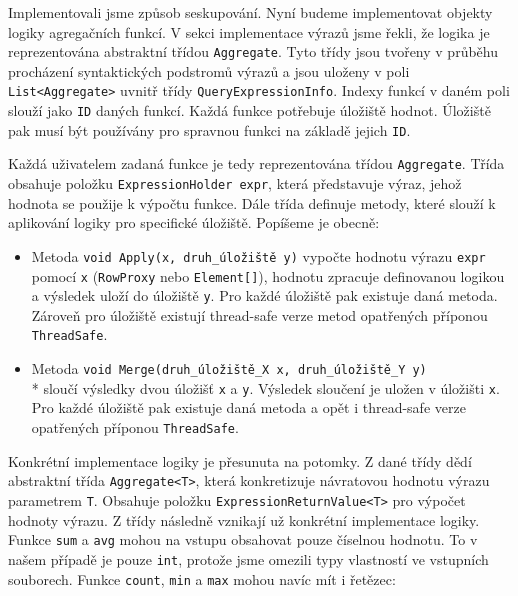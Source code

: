 Implementovali jsme způsob seskupování.
Nyní budeme implementovat objekty logiky agregačních funkcí.
V sekci implementace výrazů jsme řekli, že logika je reprezentována abstraktní třídou \texttt{Aggregate}.
Tyto třídy jsou tvořeny v průběhu procházení syntaktických podstromů výrazů a jsou uloženy v poli \texttt{List<Aggregate>} uvnitř třídy \texttt{QueryExpressionInfo}.
Indexy funkcí v daném poli slouží jako \texttt{ID} daných funkcí.
Každá funkce potřebuje úložiště hodnot.
Úložiště pak musí být používány pro spravnou funkci na základě jejich \texttt{ID}.

Každá uživatelem zadaná funkce je tedy reprezentována třídou \texttt{Aggregate}.
Třída obsahuje položku \texttt{ExpressionHolder expr}, která představuje výraz, jehož hodnota se použije k výpočtu funkce.
Dále třída definuje metody, které slouží k aplikování logiky pro specifické úložiště.
Popíšeme je obecně:
\begin{itemize}
\item Metoda \texttt{void Apply(x, druh\_úložiště y)} vypočte hodnotu výrazu \texttt{expr} pomocí \texttt{x} (\texttt{RowProxy} nebo \texttt{Element[]}), hodnotu zpracuje definovanou logikou a výsledek uloží do úložiště \texttt{y}.
Pro každé úložiště pak existuje daná metoda.
Zároveň pro úložiště existují thread-safe verze metod opatřených příponou \texttt{ThreadSafe}.

\item Metoda \texttt{void Merge(druh\_úložiště\_X x, druh\_úložiště\_Y y)}\\* sloučí výsledky dvou úložišť \texttt{x} a \texttt{y}. 
Výsledek sloučení je uložen v úložišti \texttt{x}.
Pro každé úložiště pak existuje daná metoda a opět i thread-safe verze opatřených příponou \texttt{ThreadSafe}.
\end{itemize}
Konkrétní implementace logiky je přesunuta na potomky.
Z dané třídy dědí abstraktní třída \texttt{Aggregate<T>}, která konkretizuje návratovou hodnotu výrazu parametrem \texttt{T}.
Obsahuje položku \texttt{ExpressionReturnValue<T>} pro výpočet hodnoty výrazu.
Z třídy následně vznikají už konkrétní implementace logiky.
Funkce \texttt{sum} a \texttt{avg} mohou na vstupu obsahovat pouze číselnou hodnotu.
To v našem případě je pouze \texttt{int}, protože jsme omezili typy vlastností ve vstupních souborech.
Funkce \texttt{count}, \texttt{min} a \texttt{max} mohou navíc mít i řetězec:
